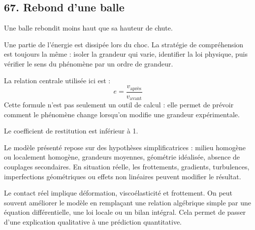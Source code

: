 \documentclass[11pt,a4paper]{article}
\begin{document}
\subsection{67. Rebond d'une balle}

\begin{exemplebox}
Une balle rebondit moins haut que sa hauteur de chute.
\end{exemplebox}

\begin{methodebox}
Une partie de l'énergie est dissipée lors du choc.
La stratégie de compréhension est toujours la même : isoler la grandeur qui varie, identifier la loi physique, puis vérifier le sens du phénomène par un ordre de grandeur.
\end{methodebox}

\begin{theorembox}
La relation centrale utilisée ici est :
\[
e=\frac{v_{\mathrm{après}}}{v_{\mathrm{avant}}}
\]
Cette formule n'est pas seulement un outil de calcul : elle permet de prévoir comment le phénomène change lorsqu'on modifie une grandeur expérimentale.
\end{theorembox}

\begin{odgbox}
Le coefficient de restitution est inférieur à 1.
\end{odgbox}

\begin{attentionbox}
Le modèle présenté repose sur des hypothèses simplificatrices : milieu homogène ou localement homogène, grandeurs moyennes, géométrie idéalisée, absence de couplages secondaires. En situation réelle, les frottements, gradients, turbulences, imperfections géométriques ou effets non linéaires peuvent modifier le résultat.
\end{attentionbox}

\begin{approfondissementbox}
Le contact réel implique déformation, viscoélasticité et frottement.
On peut souvent améliorer le modèle en remplaçant une relation algébrique simple par une équation différentielle, une loi locale ou un bilan intégral. Cela permet de passer d'une explication qualitative à une prédiction quantitative.
\end{approfondissementbox}
\end{document}
